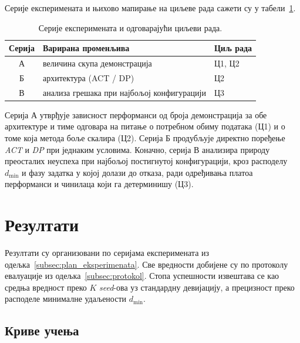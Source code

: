 \documentclass[12pt, a4paper]{article}
\begin{document}
Серије експеримената и њихово мапирање на циљеве рада сажети су у табели~\ref{tab:plan_eksperimenata}.

\begin{table}[htbp]
    \caption{Серије експеримената и одговарајући циљеви рада.}
    \label{tab:plan_eksperimenata}
    \centering
    \begin{tabular}{c l l}
        \toprule
        Серија & Варирана променљива & Циљ рада \\
        \midrule
        А & величина скупа демонстрација & Ц1, Ц2 \\
        Б & архитектура (ACT / DP) & Ц2 \\
        В & анализа грешака при најбољој конфигурацији & Ц3 \\
        \bottomrule
    \end{tabular}
\end{table}

Серија А утврђује зависност перформанси од броја демонстрација за обе архитектуре и тиме одговара на питање о потребном обиму података (Ц1) и о томе која метода боље скалира (Ц2).
Серија Б продубљује директно поређење \textit{ACT} и \textit{DP} при једнаким условима.
Коначно, серија В анализира природу преосталих неуспеха при најбољој постигнутој конфигурацији, кроз расподелу $d_{\min}$ и фазу задатка у којој долази до отказа, ради одређивања платоа перформанси и чинилаца који га детерминишу (Ц3).

\section{Резултати}
\label{sec:rezultati}

Резултати су организовани по серијама експеримената из одељка~\ref{subsec:plan_eksperimenata}.
Све вредности добијене су по протоколу евалуације из одељка~\ref{subsec:protokol}. Стопа успешности извештава се као средња вредност преко $K$ \textit{seed}-ова уз стандардну девијацију, а прецизност преко расподеле минималне удаљености $d_{\min}$.

\subsection{Криве учења}
\label{subsec:rez_krive_ucenja}
\end{document}
